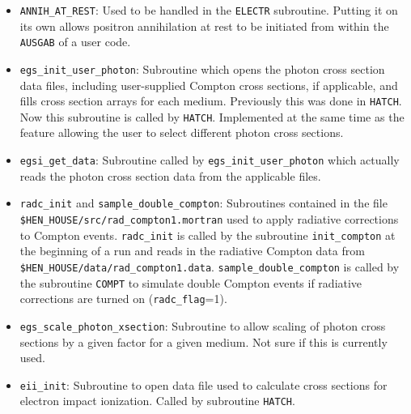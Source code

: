 \begin{itemize}

\item
{}
{\tt ANNIH\_AT\_REST}: Used to be handled in the {\tt ELECTR} subroutine.
Putting it on its own allows positron annihilation at rest to be initiated
from within the {\tt AUSGAB} of a user code.

\item
{}
{\tt egs\_init\_user\_photon}: Subroutine which opens the photon
cross section data files, including user-supplied Compton cross sections,
if applicable, and fills cross section arrays for each medium.  Previously
this was done in {\tt HATCH}.  Now this subroutine is called by {\tt HATCH}.
Implemented at the same time as the feature allowing the user to select
different photon cross sections.

\item
{}
{\tt egsi\_get\_data}: Subroutine called by
{\tt egs\_init\_user\_photon} which actually reads the photon
cross section data from the applicable files.

\item
{}
{\tt radc\_init} and {\tt sample\_double\_compton}: Subroutines contained
in the file\\ {\tt \$HEN\_HOUSE/src/rad\_compton1.mortran} used to apply
radiative corrections to Compton events.  {\tt radc\_init} is called by
the subroutine {\tt init\_compton} at the beginning of a run and reads
in the radiative Compton data from {\tt \$HEN\_HOUSE/data/rad\_compton1.data}.
{\tt sample\_double\_compton} is called by the subroutine {\tt COMPT} to
simulate double Compton events if radiative corrections are turned
on ({\tt radc\_flag}=1).

\item
{}
{\tt egs\_scale\_photon\_xsection}: Subroutine to allow scaling of
photon cross sections by a given factor for a given medium.  Not sure if
this is currently used.

\item
{}
{\tt eii\_init}: Subroutine to open data file used to calculate
cross sections for electron impact ionization.  Called by subroutine
{\tt HATCH}.


\end{itemize}
